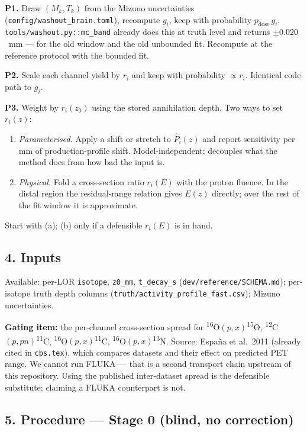 \documentclass[11pt]{article}
\newcommand{\iso}[2]{\textsuperscript{#1}#2}
\begin{document}
\noindent
\textbf{P1.} Draw $(M_k, T_k)$ from the Mizuno uncertainties
(\texttt{config/washout\_brain.toml}), recompute $g_i$, keep with probability
$p_{\mathrm{dose}}\,g_i$. \texttt{tools/washout.py::mc\_band} already does this
at truth level and returns $\pm 0.020$~mm --- for the old window and the old
unbounded fit. Recompute at the reference protocol with the bounded fit.

\noindent
\textbf{P2.} Scale each channel yield by $r_i$ and keep with probability
$\propto r_i$. Identical code path to $g_i$.

\noindent
\textbf{P3.} Weight by $r_i(z_0)$ using the stored annihilation depth. Two ways
to set $r_i(z)$:
\begin{enumerate}
  \item[(a)] \emph{Parameterised.} Apply a shift or stretch to $\hat P_i(z)$ and
    report sensitivity per mm of production-profile shift. Model-independent;
    decouples what the method does from how bad the input is.
  \item[(b)] \emph{Physical.} Fold a cross-section ratio $r_i(E)$ with the proton
    fluence. In the distal region the residual-range relation gives $E(z)$
    directly; over the rest of the fit window it is approximate.
\end{enumerate}
Start with (a); (b) only if a defensible $r_i(E)$ is in hand.

\subsection*{4. Inputs}

Available: per-LOR \texttt{isotope}, \texttt{z0\_mm}, \texttt{t\_decay\_s}
(\texttt{dev/reference/SCHEMA.md}); per-isotope truth depth columns
(\texttt{truth/activity\_profile\_fast.csv}); Mizuno uncertainties.

\textbf{Gating item:} the per-channel cross-section spread for
\iso{16}{O}$(p,x)$\iso{15}{O}, \iso{12}{C}$(p,pn)$\iso{11}{C},
\iso{16}{O}$(p,x)$\iso{11}{C}, \iso{16}{O}$(p,x)$\iso{13}{N}. Source:
Espa\~na et al.\ 2011 (already cited in \texttt{cbs.tex}), which compares
datasets and their effect on predicted PET range. We cannot run FLUKA --- that
is a second transport chain upstream of this repository. Using the published
inter-dataset spread is the defensible substitute; claiming a FLUKA counterpart
is not.

\subsection*{5. Procedure --- Stage 0 (blind, no correction)}
\end{document}
